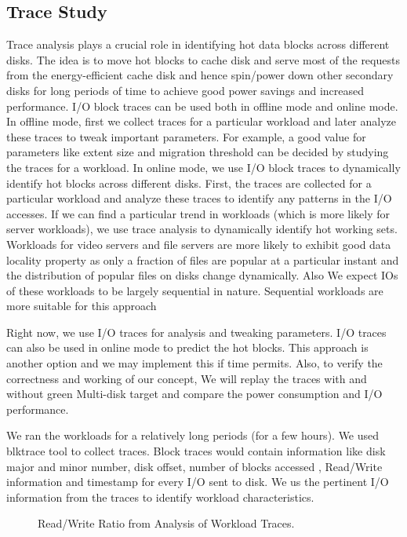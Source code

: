 \subsection{Trace Study}

Trace analysis plays a crucial role in identifying hot data blocks
across different disks. The idea is to move hot blocks to cache disk
and serve most of the requests from the energy-efficient cache disk
and hence spin/power down other secondary disks for long periods of
time to achieve good power savings and increased performance. I/O
block traces can be used both in offline mode and online mode. In
offline mode, first we collect traces for a particular workload and
later analyze these traces to tweak important parameters. For example,
a good value for parameters like extent size and migration threshold
can be decided by studying the traces for a workload. In online mode,
we use I/O block traces to dynamically identify hot blocks across
different disks. First, the traces are collected for a particular
workload and analyze these traces to identify any patterns in the I/O
accesses. If we can find a particular trend in workloads (which is
more likely for server workloads), we use trace analysis to
dynamically identify hot working sets. Workloads for video servers and
file servers are more likely to exhibit good data locality property as
only a fraction of files are popular at a particular instant and the
distribution of popular files on disks change dynamically. Also We
expect IOs of these workloads to be largely sequential in nature.
Sequential workloads are more suitable for this approach 

Right now, we use I/O traces for analysis and tweaking parameters. I/O
traces can also be used in online mode to predict the hot blocks. This
approach is another option and we may implement this if time permits.
Also, to verify the correctness and working of our concept, We will
replay the traces with and without green Multi-disk target and compare
the power consumption and I/O performance. 

We ran the workloads for a relatively long periods (for a few hours).
We used blktrace tool to collect traces. Block traces would contain
information like disk major and minor number, disk offset, number of
blocks accessed , Read/Write information  and timestamp for every I/O
sent to disk. We us the pertinent I/O information from the traces to
identify workload characteristics.

\begin{figure}[ht]
\begin{centering}
\caption{Read/Write Ratio from Analysis of Workload Traces.}
\label{fig:rw}
\end{centering}
\end{figure}

